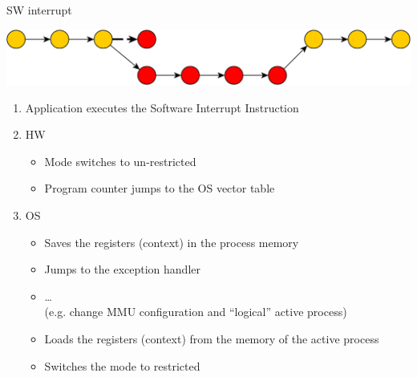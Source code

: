 \documentclass{beamer}
\begin{document}
\begin{frame}{SW interrupt}
\begin{center}
\includegraphics[width=0.5\linewidth]{switch}
\end{center}
  \begin{enumerate}
  \item<1-> Application executes the Software Interrupt Instruction
  \item<2-> HW
  \begin{itemize}
    \item Mode switches to un-restricted
    \item Program counter jumps to the OS \alert{vector table}
  \end{itemize}
  \item<3-> OS
  \begin{itemize}
    \item Saves the registers (context) in the process memory
    \item Jumps to the \alert{exception handler}
    \item \dots \\
 (e.g. change MMU configuration and ``logical'' active process)
    \item Loads the registers (context) from the memory of the  \alert{active}
      process
    \item Switches the mode to restricted
  \end{itemize}

\end{enumerate}
\end{frame}
\end{document}
